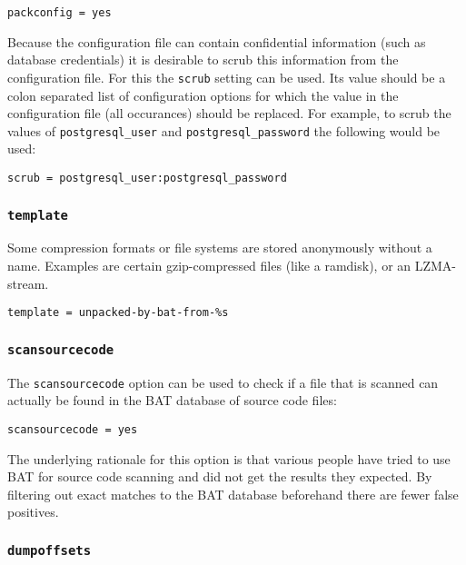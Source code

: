 \documentclass[10pt,a4paper]{article}
\begin{document}
\begin{verbatim}
packconfig = yes
\end{verbatim}

Because the configuration file can contain confidential information (such as
database credentials) it is desirable to scrub this information from the
configuration file. For this the \texttt{scrub} setting can be used. Its value
should be a colon separated list of configuration options for which the value
in the configuration file (all occurances) should be replaced. For example, to
scrub the values of \texttt{postgresql\_user} and \texttt{postgresql\_password}
the following would be used:

\begin{verbatim}
scrub = postgresql_user:postgresql_password
\end{verbatim}

\subsubsection{\texttt{template}}

Some compression formats or file systems are stored anonymously without a name.
Examples are certain gzip-compressed files (like a ramdisk), or an LZMA-stream.

\begin{verbatim}
template = unpacked-by-bat-from-%s
\end{verbatim}

\subsubsection{\texttt{scansourcecode}}

The \texttt{scansourcecode} option can be used to check if a file that is
scanned can actually be found in the BAT database of source code files:

\begin{verbatim}
scansourcecode = yes
\end{verbatim}

The underlying rationale for this option is that various people have tried to
use BAT for source code scanning and did not get the results they expected. By
filtering out exact matches to the BAT database beforehand there are fewer
false positives.

\subsubsection{\texttt{dumpoffsets}}
\end{document}
